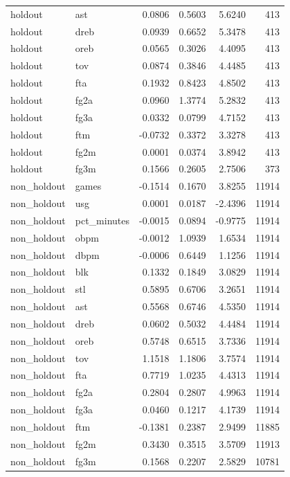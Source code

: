 \begin{table}
\begin{tabular}{llrrrr}
holdout & ast & 0.0806 & 0.5603 & 5.6240 & 413 \\
holdout & dreb & 0.0939 & 0.6652 & 5.3478 & 413 \\
holdout & oreb & 0.0565 & 0.3026 & 4.4095 & 413 \\
holdout & tov & 0.0874 & 0.3846 & 4.4485 & 413 \\
holdout & fta & 0.1932 & 0.8423 & 4.8502 & 413 \\
holdout & fg2a & 0.0960 & 1.3774 & 5.2832 & 413 \\
holdout & fg3a & 0.0332 & 0.0799 & 4.7152 & 413 \\
holdout & ftm & -0.0732 & 0.3372 & 3.3278 & 413 \\
holdout & fg2m & 0.0001 & 0.0374 & 3.8942 & 413 \\
holdout & fg3m & 0.1566 & 0.2605 & 2.7506 & 373 \\
non\_holdout & games & -0.1514 & 0.1670 & 3.8255 & 11914 \\
non\_holdout & usg & 0.0001 & 0.0187 & -2.4396 & 11914 \\
non\_holdout & pct\_minutes & -0.0015 & 0.0894 & -0.9775 & 11914 \\
non\_holdout & obpm & -0.0012 & 1.0939 & 1.6534 & 11914 \\
non\_holdout & dbpm & -0.0006 & 0.6449 & 1.1256 & 11914 \\
non\_holdout & blk & 0.1332 & 0.1849 & 3.0829 & 11914 \\
non\_holdout & stl & 0.5895 & 0.6706 & 3.2651 & 11914 \\
non\_holdout & ast & 0.5568 & 0.6746 & 4.5350 & 11914 \\
non\_holdout & dreb & 0.0602 & 0.5032 & 4.4484 & 11914 \\
non\_holdout & oreb & 0.5748 & 0.6515 & 3.7336 & 11914 \\
non\_holdout & tov & 1.1518 & 1.1806 & 3.7574 & 11914 \\
non\_holdout & fta & 0.7719 & 1.0235 & 4.4313 & 11914 \\
non\_holdout & fg2a & 0.2804 & 0.2807 & 4.9963 & 11914 \\
non\_holdout & fg3a & 0.0460 & 0.1217 & 4.1739 & 11914 \\
non\_holdout & ftm & -0.1381 & 0.2387 & 2.9499 & 11885 \\
non\_holdout & fg2m & 0.3430 & 0.3515 & 3.5709 & 11913 \\
non\_holdout & fg3m & 0.1568 & 0.2207 & 2.5829 & 10781 \\
\bottomrule
\end{tabular}
\end{table}
